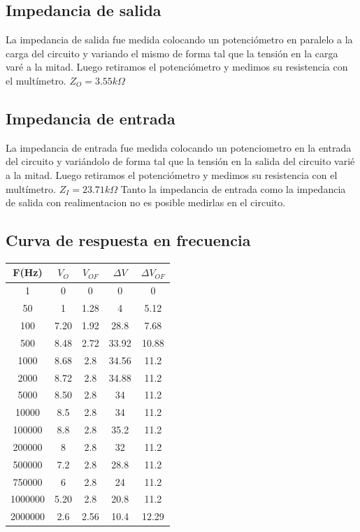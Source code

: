 \documentclass[12pt]{article}
\begin{document}
\subsection{Impedancia de salida }
La impedancia de salida fue medida colocando un potenciómetro en paralelo a la carga del circuito y variando el mismo de forma tal que la tensión en la carga varé a la mitad. Luego retiramos el potenciómetro y medimos su resistencia con el multímetro.
$ Z_O= 3.55k\Omega$
\subsection{Impedancia de entrada }
La impedancia de entrada fue medida colocando un potenciometro en la entrada del circuito y variándolo de forma tal que la tensión en la salida del circuito varié a la mitad. Luego retiramos el potenciómetro y medimos su resistencia con el multímetro.
$Z_I= 23.71k\Omega$
Tanto la impedancia de entrada como la impedancia de salida con realimentacion no es posible medirlas en el circuito.

\subsection{Curva de respuesta en frecuencia}
\begin{tabular}{| c | c | c | c | c | }
 \hline                 
 F(Hz) & $V_O$ & $V_{OF}$ & $\Delta V$ & $\Delta V_{OF}$  \\
 \hline                 
  1       & 0    & 0    & 0     & 0 \\
 \hline                 
  50      & 1    & 1.28 & 4     & 5.12  \\
 \hline                 
  100     & 7.20 & 1.92 & 28.8  & 7.68  \\
 \hline                
  500     & 8.48 & 2.72 & 33.92 & 10.88  \\
 \hline                
  1000    & 8.68 & 2.8  & 34.56 & 11.2  \\
 \hline                
  2000    & 8.72 & 2.8  & 34.88 & 11.2 \\
 \hline                
  5000    & 8.50 & 2.8  & 34    & 11.2 \\
 \hline                
  10000   & 8.5  & 2.8  & 34    & 11.2 \\
 \hline                
  100000  & 8.8  & 2.8  & 35.2  & 11.2  \\
 \hline                
  200000  & 8    & 2.8  & 32    & 11.2  \\
 \hline                
  500000  & 7.2  & 2.8  & 28.8  & 11.2  \\
 \hline                
  750000  & 6    & 2.8  & 24    & 11.2  \\
 \hline                
  1000000 & 5.20 & 2.8  & 20.8  & 11.2  \\
 \hline                
  2000000 & 2.6  & 2.56 & 10.4  & 12.29  \\
 \hline                
 \end{tabular}
\end{document}
